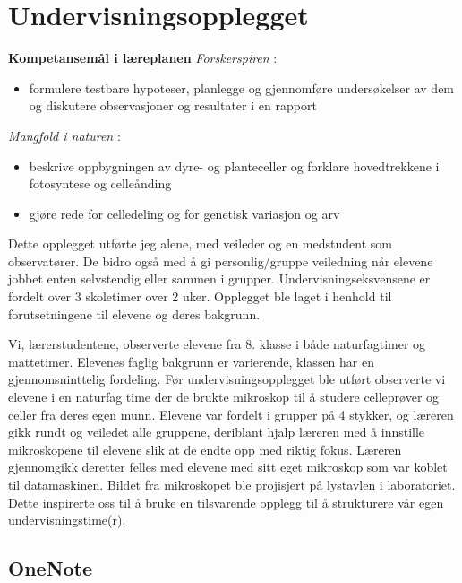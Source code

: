 \documentclass[main.tex]{subfiles}
\begin{document}
\section{Undervisningsopplegget}
\label{sec:1}

\textbf{Kompetansemål i læreplanen}
\newline
\emph{Forskerspiren} :
\begin{itemize}
\vspace{-2cm}
\item formulere testbare hypoteser, planlegge og gjennomføre undersøkelser 
av dem og diskutere observasjoner og resultater i en rapport
\end{itemize}
\emph{Mangfold i naturen} :
\begin{itemize}
\vspace{-2cm}
\item beskrive oppbygningen av dyre- og planteceller og forklare hovedtrekkene i fotosyntese og celleånding
\vspace{-2cm}
\item gjøre rede for celledeling og for genetisk variasjon og arv
\end{itemize}
Dette opplegget utførte jeg alene, med veileder og en medstudent som observatører. 
De bidro også med å gi personlig/gruppe veiledning når elevene jobbet enten selvstendig eller sammen i grupper. 
Undervisningseksvensene er fordelt over 3 skoletimer over 2 uker. Opplegget ble laget i henhold til 
forutsetningene til elevene og deres bakgrunn. 

Vi, lærerstudentene, observerte elevene fra 8. klasse i både naturfagtimer og mattetimer. Elevenes faglig bakgrunn er varierende, 
klassen har en gjennomsninttelig fordeling. 
Før undervisningsopplegget ble utført observerte vi elevene i en naturfag time der de brukte mikroskop til å studere celleprøver 
og celler fra deres egen munn. Elevene var fordelt i grupper på 4 stykker, og læreren gikk rundt og veiledet alle gruppene, 
deriblant hjalp læreren med å innstille mikroskopene til elevene slik at de endte opp med riktig fokus. Læreren gjennomgikk deretter 
felles med elevene med sitt eget mikroskop som var koblet til datamaskinen. Bildet fra mikroskopet ble projisjert på lystavlen 
i laboratoriet. Dette inspirerte oss til å bruke en tilsvarende opplegg til å strukturere vår egen undervisningstime(r).

\subsection{OneNote}
\end{document}
